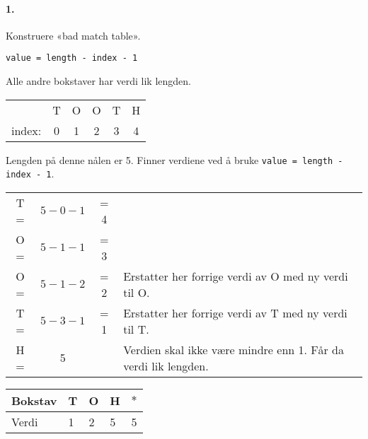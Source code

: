 \documentclass[11pt,a4paper]{article}
\theoremstyle{def}
\begin{document}
\paragraph{1.} Konstruere «bad match table». 
\begin{center}
\texttt{value = length - index - 1}
\end{center}
Alle andre bokstaver har verdi lik lengden.
\begin{center}
\begin{tabular}{rccccc}
&T&O&O&T&H\\
index:&0&1&2&3&4\\
\end{tabular}
\end{center}
Lengden på denne nålen er 5. Finner verdiene ved å bruke \texttt{value = length - index - 1}.
\begin{center}
\begin{tabular}{cccl}
T = & $5-0-1$&= 4\\
O = & $5-1-1$&= 3\\
O = & $5-1-2$&= 2&Erstatter her forrige verdi av O med ny verdi til O.\\
T = &$5-3-1$& = 1&Erstatter her forrige verdi av T med ny verdi til T.\\
H = &5 &&Verdien skal ikke være mindre enn 1. Får da verdi lik lengden.\\
\end{tabular}

\begin{tabular}{l|llll}
Bokstav&T&O&H&$*$\\
\hline
Verdi&1&2&5&5\\
\end{tabular}
\end{center}

\end{document}

